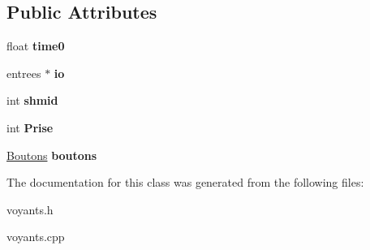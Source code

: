 \subsection*{Public Attributes}
\begin{DoxyCompactItemize}
\item 
\mbox{\label{classVoyants_adef49e24a227ab2fbcb81cf4375c2bdd}} 
float {\bfseries time0}
\item 
\mbox{\label{classVoyants_acb40f64dd3c520e531580c735b135ed8}} 
entrees $\ast$ {\bfseries io}
\item 
\mbox{\label{classVoyants_a7af4c77e98932d2e1a78a017233f5dac}} 
int {\bfseries shmid}
\item 
\mbox{\label{classVoyants_a3b33314673138a6e84a0fb986141dbf0}} 
int {\bfseries Prise}
\item 
\mbox{\label{classVoyants_ae36425d779d8c533ff3eb8e46db0ddd2}} 
\hyperlink{classBoutons}{Boutons} {\bfseries boutons}
\end{DoxyCompactItemize}


The documentation for this class was generated from the following files\+:\begin{DoxyCompactItemize}
\item 
voyants.\+h\item 
voyants.\+cpp\end{DoxyCompactItemize}
